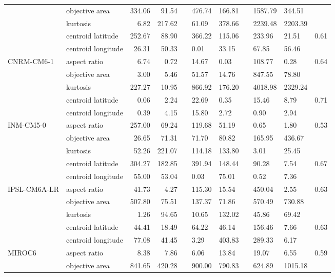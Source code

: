 \begin{longtable}{llrrlllllll}
 & objective area & 334.06 & 91.54 &  & 476.74 & 166.81 &  & 1587.79 & 344.51 &  \\
 & kurtosis & 6.82 & 217.62 &  & 61.09 & 378.66 &  & 2239.48 & 2203.39 &  \\
 & centroid latitude & 252.67 & 88.90 &  & 366.22 & 115.06 &  & 233.96 & 21.51 & 0.61 \\
 & centroid longitude & 26.31 & 50.33 &  & 0.01 & 33.15 &  & 67.85 & 56.46 &  \\
\cline{1-11}
\multirow[t]{5}{*}{CNRM-CM6-1} & aspect ratio & 6.74 & 0.72 &  & 14.67 & 0.03 &  & 108.77 & 0.28 & 0.64 \\
 & objective area & 3.00 & 5.46 &  & 51.57 & 14.76 &  & 847.55 & 78.80 &  \\
 & kurtosis & 227.27 & 10.95 &  & 866.92 & 176.20 &  & 4018.98 & 2329.24 &  \\
 & centroid latitude & 0.06 & 2.24 &  & 22.69 & 0.35 &  & 15.46 & 8.79 & 0.71 \\
 & centroid longitude & 0.39 & 4.15 &  & 15.80 & 2.72 &  & 0.90 & 2.94 &  \\
\cline{1-11}
\multirow[t]{5}{*}{INM-CM5-0} & aspect ratio & 257.00 & 69.24 &  & 119.68 & 51.19 &  & 0.65 & 1.80 & 0.53 \\
 & objective area & 26.65 & 71.31 &  & 71.70 & 80.82 &  & 165.95 & 436.67 &  \\
 & kurtosis & 52.26 & 221.07 &  & 114.18 & 133.80 &  & 3.01 & 25.45 &  \\
 & centroid latitude & 304.27 & 182.85 &  & 391.94 & 148.44 &  & 90.28 & 7.54 & 0.67 \\
 & centroid longitude & 55.00 & 53.04 &  & 0.03 & 75.01 &  & 0.52 & 7.36 &  \\
\cline{1-11}
\multirow[t]{5}{*}{IPSL-CM6A-LR} & aspect ratio & 41.73 & 4.27 &  & 115.30 & 15.54 &  & 450.04 & 2.55 & 0.63 \\
 & objective area & 507.80 & 75.51 &  & 137.37 & 71.86 &  & 570.49 & 730.88 &  \\
 & kurtosis & 1.26 & 94.65 &  & 10.65 & 132.02 &  & 45.86 & 69.42 &  \\
 & centroid latitude & 44.41 & 18.49 &  & 64.22 & 46.14 &  & 156.46 & 7.66 & 0.63 \\
 & centroid longitude & 77.08 & 41.45 &  & 3.29 & 403.83 &  & 289.33 & 6.17 &  \\
\cline{1-11}
\multirow[t]{5}{*}{MIROC6} & aspect ratio & 8.38 & 7.86 &  & 6.06 & 13.84 &  & 19.07 & 6.55 & 0.59 \\
 & objective area & 841.65 & 420.28 &  & 900.00 & 790.83 &  & 624.89 & 1015.18 &  \\

\end{longtable}

